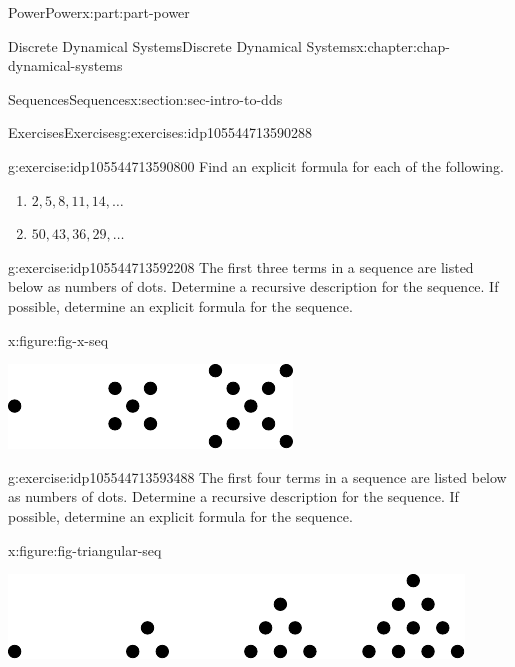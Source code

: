 \documentclass[oneside,10pt,]{book}
\numberwithin{equation}{section}
\begin{document}
\begin{partptx}{Power}{}{Power}{}{}{x:part:part-power}
\begin{chapterptx}{Discrete Dynamical Systems}{}{Discrete Dynamical Systems}{}{}{x:chapter:chap-dynamical-systems}
\begin{sectionptx}{Sequences}{}{Sequences}{}{}{x:section:sec-intro-to-dds}
\begin{exercises-subsection-numberless}{Exercises}{}{Exercises}{}{}{g:exercises:idp105544713590288}
\begin{divisionexercise}{1}{}{}{g:exercise:idp105544713590800}%
Find an explicit formula for each of the following.%
%
\begin{enumerate}[label=(\alph*)]
\item{}\(\displaystyle 2, 5, 8, 11, 14, \ldots\)%
\item{}\(\displaystyle 50, 43, 36, 29, \ldots\)%
\end{enumerate}
\end{divisionexercise}%
\begin{divisionexercise}{2}{}{}{g:exercise:idp105544713592208}%
The first three terms in a sequence are listed below as numbers of dots. Determine a recursive description for the sequence. If possible, determine an explicit formula for the sequence.%
\begin{figureptx}{}{x:figure:fig-x-seq}{}%
\begin{image}{0}{1}{0}%
\includegraphics[width=\linewidth]{./images/x.pdf}
\end{image}%
\tcblower
\end{figureptx}%
\end{divisionexercise}%
\begin{divisionexercise}{3}{}{}{g:exercise:idp105544713593488}%
The first four terms in a sequence are listed below as numbers of dots. Determine a recursive description for the sequence. If possible, determine an explicit formula for the sequence.%
\begin{figureptx}{}{x:figure:fig-triangular-seq}{}%
\begin{image}{0}{1}{0}%
\includegraphics[width=\linewidth]{./images/triangular.pdf}
\end{image}%
\tcblower
\end{figureptx}%
\end{divisionexercise}%

\end{exercises-subsection-numberless}
\end{sectionptx}
\end{chapterptx}
\end{partptx}
\end{document}
